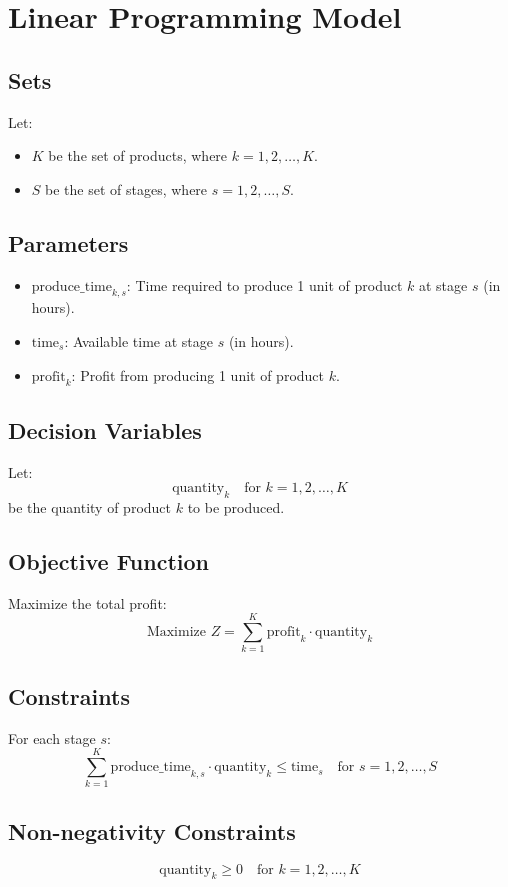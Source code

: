 \documentclass{article}
\begin{document}
\section*{Linear Programming Model}

\subsection*{Sets}
Let:
\begin{itemize}
    \item \( K \) be the set of products, where \( k = 1, 2, \ldots, K \).
    \item \( S \) be the set of stages, where \( s = 1, 2, \ldots, S \).
\end{itemize}

\subsection*{Parameters}
\begin{itemize}
    \item \( \text{produce\_time}_{k,s} \): Time required to produce 1 unit of product \( k \) at stage \( s \) (in hours).
    \item \( \text{time}_s \): Available time at stage \( s \) (in hours).
    \item \( \text{profit}_k \): Profit from producing 1 unit of product \( k \).
\end{itemize}

\subsection*{Decision Variables}
Let:
\[
\text{quantity}_k \quad \text{for } k = 1, 2, \ldots, K
\]
be the quantity of product \( k \) to be produced.

\subsection*{Objective Function}
Maximize the total profit:
\[
\text{Maximize } Z = \sum_{k=1}^{K} \text{profit}_k \cdot \text{quantity}_k
\]

\subsection*{Constraints}
For each stage \( s \):
\[
\sum_{k=1}^{K} \text{produce\_time}_{k,s} \cdot \text{quantity}_k \leq \text{time}_s \quad \text{for } s = 1, 2, \ldots, S
\]

\subsection*{Non-negativity Constraints}
\[
\text{quantity}_k \geq 0 \quad \text{for } k = 1, 2, \ldots, K
\]
\end{document}
